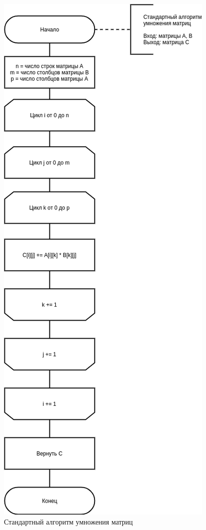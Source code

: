 \begin{figure}[H]
	\begin{center}
		\includegraphics[scale=0.6]{img/standard.png}
	\end{center}
	\captionsetup{justification=centering}
	\caption{Стандартный алгоритм умножения матриц}
	\label{img:standard}
\end{figure}

